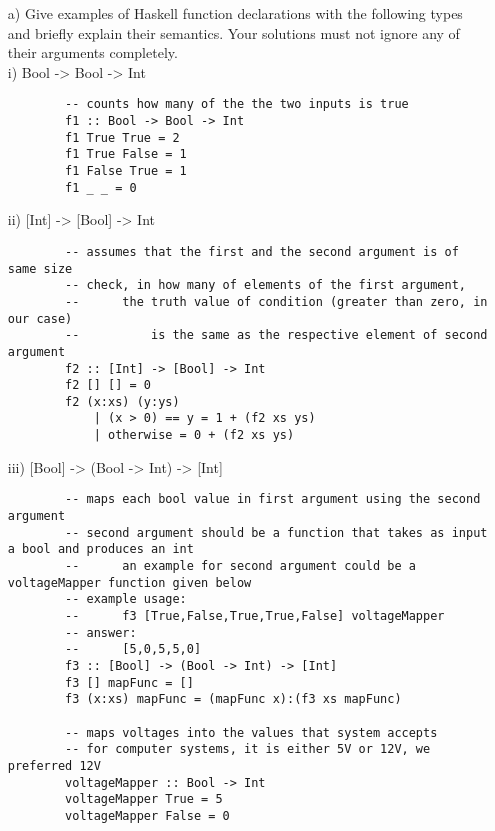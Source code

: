 \documentclass[10pt]{article}
\begin{document}
\begin{itemize}

\item[a)] Give examples of Haskell function declarations with the following types and briefly explain their semantics. Your solutions must not ignore any of their arguments completely.\\
i) Bool -> Bool -> Int

	\begin{addmargin}[0em]{2em}
		\begin{lstlisting}
		-- counts how many of the the two inputs is true
		f1 :: Bool -> Bool -> Int
		f1 True True = 2
		f1 True False = 1
		f1 False True = 1
		f1 _ _ = 0
		\end{lstlisting}
	\end{addmargin}

ii) [Int] -> [Bool] -> Int
	\begin{addmargin}[0em]{2em}
		\begin{lstlisting}
		-- assumes that the first and the second argument is of same size
		-- check, in how many of elements of the first argument,
		--      the truth value of condition (greater than zero, in our case)
		--          is the same as the respective element of second argument
		f2 :: [Int] -> [Bool] -> Int
		f2 [] [] = 0
		f2 (x:xs) (y:ys)
		    | (x > 0) == y = 1 + (f2 xs ys)
		    | otherwise = 0 + (f2 xs ys)
		\end{lstlisting}
	\end{addmargin}

iii) [Bool] -> (Bool -> Int) -> [Int]

	\begin{addmargin}[0em]{2em}
		\begin{lstlisting}
		-- maps each bool value in first argument using the second argument
		-- second argument should be a function that takes as input a bool and produces an int
		--      an example for second argument could be a voltageMapper function given below
		-- example usage:
		--      f3 [True,False,True,True,False] voltageMapper
		-- answer:
		--      [5,0,5,5,0]
		f3 :: [Bool] -> (Bool -> Int) -> [Int]
		f3 [] mapFunc = []
		f3 (x:xs) mapFunc = (mapFunc x):(f3 xs mapFunc)
		
		-- maps voltages into the values that system accepts
		-- for computer systems, it is either 5V or 12V, we preferred 12V
		voltageMapper :: Bool -> Int
		voltageMapper True = 5
		voltageMapper False = 0
		\end{lstlisting}
	\end{addmargin}


\end{itemize}
\end{document}
